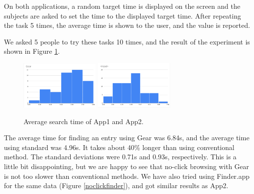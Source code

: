\documentclass[conference]{IEEEtran}
\begin{document}
On both applications, a random target time is displayed on the screen and the subjects are
asked to set the time to the displayed target time.
After repeating the task 5 times, the average time is shown to the user, and the value
is reported.

We asked 5 people to try these tasks 10 times, and the result of the experiment is
shown in Figure \ref{monorailtime}.

\begin{figure}[H]
\centerline{
  \includegraphics[width=39mm,bb=0 0 960 593]{figures/6c39f199b341e30ffc28850afbd90a5a.png}
  \includegraphics[width=39mm,bb=0 0 960 593]{figures/de3f0545e0d0d8dfb9708d2420fb5407.png}
}
\caption{Average search time of App1 and App2.}
\label{monorailtime}
\end{figure}

The average time for finding an entry using Gear was 6.84s,
and the average time using standard  was 4.96s.
It takes about 40\% longer than using conventional method.
The standard deviations were 0.71s and 0.93s, respectively.
%
This is a little bit disappointing,
but we are happy to see that
no-click browsing with Gear is not too slower than
conventional methods.
%
We have also tried using Finder.app for the same data (Figure \ref{noclickfinder}), and
got similar results as App2.

\end{document}
